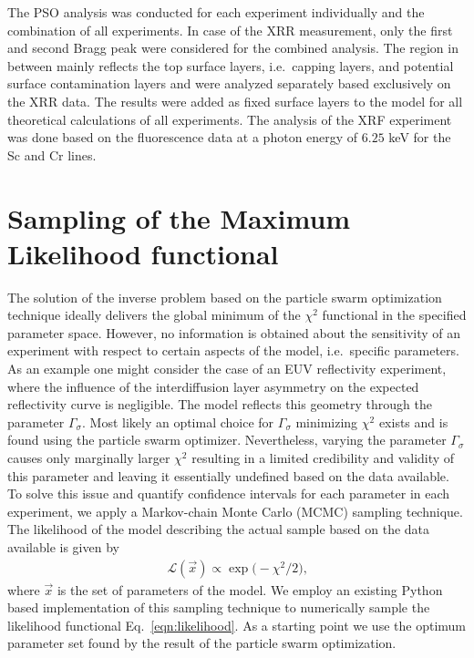 \documentclass{iucr}              %
\begin{document}
The PSO analysis was conducted for each experiment individually and the combination of all experiments. In case of the XRR measurement, only the first and second Bragg peak were considered for the combined analysis. The region in between mainly reflects the top surface layers, i.e.~capping layers, and potential surface contamination layers and were analyzed separately based exclusively on the XRR data. The results were added as fixed surface layers to the model for all theoretical calculations of all experiments. The analysis of the XRF experiment was done based on the fluorescence data at a photon energy of $6.25$ keV for the Sc and Cr lines.


\section{Sampling of the Maximum Likelihood functional}

The solution of the inverse problem based on the particle swarm optimization technique ideally delivers the global minimum of the $\chi^2$ functional in the specified parameter space. However, no information is obtained about the sensitivity of an experiment with respect to certain aspects of the model, i.e.~specific parameters. As an example one might consider the case of an EUV reflectivity experiment, where the influence of the interdiffusion layer asymmetry on the expected reflectivity curve is negligible. The model reflects this geometry through the parameter $\Gamma_\sigma$. Most likely an optimal choice for $\Gamma_\sigma$ minimizing $\chi^2$ exists and is found using the particle swarm optimizer. Nevertheless, varying the parameter $\Gamma_\sigma$ causes only marginally larger $\chi^2$ resulting in a limited credibility and validity of this parameter and leaving it essentially undefined based on the data available. To solve this issue and quantify confidence intervals for each parameter in each experiment, we apply a Markov-chain Monte Carlo (MCMC) sampling technique. The likelihood of the model describing the actual sample based on the data available is given by
\begin{align}
\mathcal{L}(\vec{x}) \propto \exp \big(-\chi^2 / 2 \big) \text{,} \label{eqn:likelihood}
\end{align}
where $\vec{x}$ is the set of parameters of the model.
We employ an existing Python based implementation of this sampling technique \cite{emcee} to numerically sample the likelihood functional Eq.~\eqref{eqn:likelihood}. As a starting point we use the optimum parameter set found by the result of the particle swarm optimization.
\end{document}
